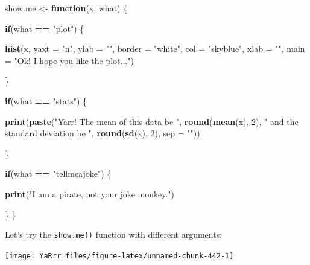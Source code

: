 \documentclass[]{book}
\newenvironment{Shaded}{\begin{snugshade}}{\end{snugshade}}
\newcommand{\KeywordTok}[1]{\textcolor[rgb]{0.13,0.29,0.53}{\textbf{#1}}}
\newcommand{\DataTypeTok}[1]{\textcolor[rgb]{0.13,0.29,0.53}{#1}}
\newcommand{\DecValTok}[1]{\textcolor[rgb]{0.00,0.00,0.81}{#1}}
\newcommand{\StringTok}[1]{\textcolor[rgb]{0.31,0.60,0.02}{#1}}
\newcommand{\ControlFlowTok}[1]{\textcolor[rgb]{0.13,0.29,0.53}{\textbf{#1}}}
\newcommand{\OperatorTok}[1]{\textcolor[rgb]{0.81,0.36,0.00}{\textbf{#1}}}
\newcommand{\NormalTok}[1]{#1}
\theoremstyle{definition}
\theoremstyle{definition}
\theoremstyle{remark}
\begin{document}
\begin{Shaded}
\begin{Highlighting}[]
\NormalTok{show.me <-}\StringTok{ }\ControlFlowTok{function}\NormalTok{(x, what) \{}

\ControlFlowTok{if}\NormalTok{(what }\OperatorTok{==}\StringTok{ "plot"}\NormalTok{) \{}
  
  \KeywordTok{hist}\NormalTok{(x, }\DataTypeTok{yaxt =} \StringTok{"n"}\NormalTok{, }\DataTypeTok{ylab =} \StringTok{""}\NormalTok{, }\DataTypeTok{border =} \StringTok{"white"}\NormalTok{, }
       \DataTypeTok{col =} \StringTok{"skyblue"}\NormalTok{, }\DataTypeTok{xlab =} \StringTok{""}\NormalTok{,}
       \DataTypeTok{main =} \StringTok{"Ok! I hope you like the plot..."}\NormalTok{)}
  
\NormalTok{\}}

\ControlFlowTok{if}\NormalTok{(what }\OperatorTok{==}\StringTok{ "stats"}\NormalTok{) \{}
  
  \KeywordTok{print}\NormalTok{(}\KeywordTok{paste}\NormalTok{(}\StringTok{"Yarr! The mean of this data be "}\NormalTok{, }
                  \KeywordTok{round}\NormalTok{(}\KeywordTok{mean}\NormalTok{(x), }\DecValTok{2}\NormalTok{),}
              \StringTok{" and the standard deviation be "}\NormalTok{, }
              \KeywordTok{round}\NormalTok{(}\KeywordTok{sd}\NormalTok{(x), }\DecValTok{2}\NormalTok{),}
              \DataTypeTok{sep =} \StringTok{""}\NormalTok{))}
  
\NormalTok{\}}

\ControlFlowTok{if}\NormalTok{(what }\OperatorTok{==}\StringTok{ "tellmeajoke"}\NormalTok{) \{}
  
  \KeywordTok{print}\NormalTok{(}\StringTok{"I am a pirate, not your joke monkey."}\NormalTok{)}
  
\NormalTok{\}}
\NormalTok{\}}
\end{Highlighting}
\end{Shaded}

Let's try the \texttt{show.me()} function with different arguments:

\begin{Shaded}
\end{Shaded}

\begin{center}\texttt{[image: YaRrr\_files/figure-latex/unnamed-chunk-442-1]} \end{center}
\end{document}
